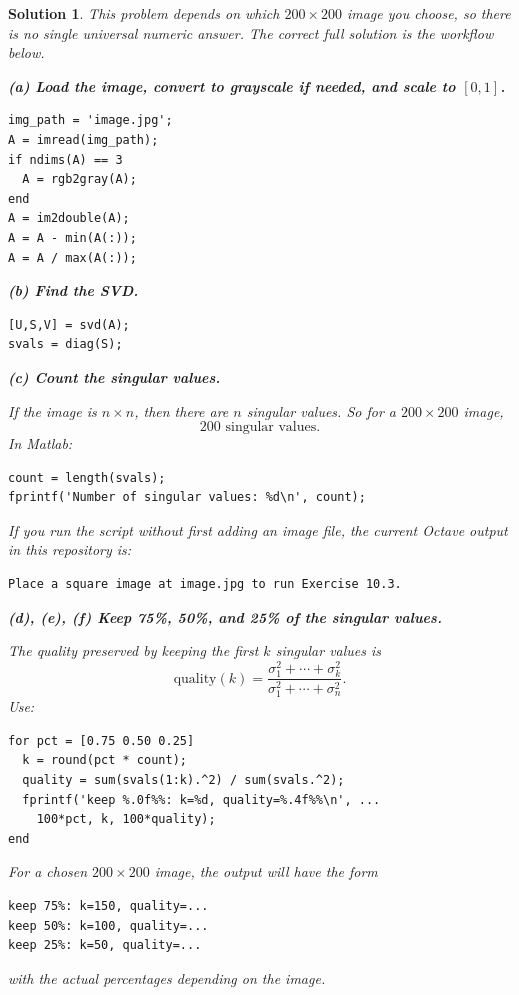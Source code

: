 \documentclass[11pt,a4paper]{article}
\theoremstyle{sol}
\newtheorem*{solution}{Solution}
\begin{document}
\begin{solution}
This problem depends on \emph{which} $200\times200$ image you choose, so there is no single universal numeric answer. The correct full solution is the workflow below.

\textbf{(a) Load the image, convert to grayscale if needed, and scale to $[0,1]$.}
\begin{lstlisting}
img_path = 'image.jpg';
A = imread(img_path);
if ndims(A) == 3
  A = rgb2gray(A);
end
A = im2double(A);
A = A - min(A(:));
A = A / max(A(:));
\end{lstlisting}

\textbf{(b) Find the SVD.}
\begin{lstlisting}
[U,S,V] = svd(A);
svals = diag(S);
\end{lstlisting}

\textbf{(c) Count the singular values.}

If the image is $n\times n$, then there are $n$ singular values. So for a $200\times200$ image,
\[
\boxed{200\text{ singular values}.}
\]
In Matlab:
\begin{lstlisting}
count = length(svals);
fprintf('Number of singular values: %d\n', count);
\end{lstlisting}

If you run the script without first adding an image file, the current Octave output in this repository is:
\begin{lstlisting}
Place a square image at image.jpg to run Exercise 10.3.
\end{lstlisting}

\textbf{(d), (e), (f) Keep 75\%, 50\%, and 25\% of the singular values.}

The quality preserved by keeping the first $k$ singular values is
\[
\text{quality}(k)=\frac{\sigma_1^2+\cdots+\sigma_k^2}{\sigma_1^2+\cdots+\sigma_n^2}.
\]
Use:
\begin{lstlisting}
for pct = [0.75 0.50 0.25]
  k = round(pct * count);
  quality = sum(svals(1:k).^2) / sum(svals.^2);
  fprintf('keep %.0f%%: k=%d, quality=%.4f%%\n', ...
    100*pct, k, 100*quality);
end
\end{lstlisting}

For a chosen $200\times200$ image, the output will have the form
\begin{lstlisting}
keep 75%: k=150, quality=...
keep 50%: k=100, quality=...
keep 25%: k=50, quality=...
\end{lstlisting}
with the actual percentages depending on the image.


\end{solution}
\end{document}

